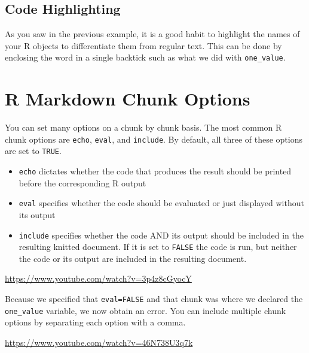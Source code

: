 \documentclass[]{tufte-book}
\begin{document}
\hypertarget{code-highlighting}{%
\subsection{Code Highlighting}\label{code-highlighting}}

As you saw in the previous example, it is a good habit to highlight the names of your R objects to differentiate them from regular text. This can be done by enclosing the word in a single backtick such as what we did with \texttt{one\_value}.

\hypertarget{r-markdown-chunk-options}{%
\section{R Markdown Chunk Options}\label{r-markdown-chunk-options}}

You can set many options on a chunk by chunk basis. The most common R chunk options are \texttt{echo}, \texttt{eval}, and \texttt{include}. By default, all three of these options are set to \texttt{TRUE}.

\begin{itemize}
\item
  \texttt{echo} dictates whether the code that produces the result should be printed before the corresponding R output
\item
  \texttt{eval} specifies whether the code should be evaluated or just displayed without its output
\item
  \texttt{include} specifies whether the code AND its output should be included in the resulting knitted document. If it is set to \texttt{FALSE} the code is run, but neither the code or its output are included in the resulting document.
\end{itemize}

\vspace{0.1in}\begin{center}\footnotesize{\url{https://www.youtube.com/watch?v=3p4z8cGyocY}}\end{center}\vspace{0.1in}

Because we specified that \texttt{eval=FALSE} and that chunk was where we declared the \texttt{one\_value} variable, we now obtain an error. You can include multiple chunk options by separating each option with a comma.

\vspace{0.1in}\begin{center}\footnotesize{\url{https://www.youtube.com/watch?v=46N738U3q7k}}\end{center}\vspace{0.1in}
\end{document}
